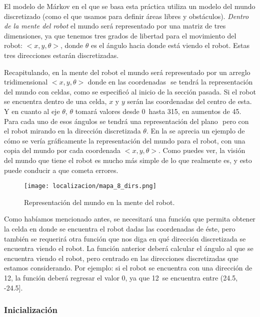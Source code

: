 El modelo de Márkov en el que se basa esta práctica utiliza un modelo del mundo discretizado (como el que usamos para definir áreas libres y obstáculos). \textit{Dentro de la mente del robot} el mundo será representado por una matriz de tres dimensiones, ya que tenemos tres grados de libertad para el movimiento del robot: \(<x,y,\theta>\), donde \( \theta \) es el ángulo hacia donde está viendo el robot. Estas tres direcciones estarán discretizadas.\par

Recapitulando, en la mente del robot el mundo será representado por un arreglo tridimensional \(<x,y,\theta>\) donde en las coordenadas \(<x,y>\) se tendrá la representación del mundo con celdas, como se especificó al inicio de la sección pasada. Si el robot se encuentra dentro de una celda, \(x\) y \(y\) serán las coordenadas del centro de esta. Y en cuanto al eje \(\theta\), \(\theta\) tomará valores desde 0\degree \ hasta 315\degree, en aumentos de 45\degree. Para cada uno de esos ángulos se tendrá una representación del plano \(<x,y>\) pero con el robot mirando en la dirección discretizada \(\theta\). En la  se aprecia un ejemplo de cómo se vería gráficamente la representación del mundo para el robot, con una copia del mundo por cada coordenada \(<x,y,\theta>\). Como puedes ver, la visión del mundo que tiene el robot es mucho más simple de lo que realmente es, y esto puede conducir a que cometa errores.

\begin{figure}
  \centering
  \texttt{[image: localizacion/mapa\_8\_dirs.png]}
  \caption{Representación del mundo en la mente del robot.}
  \label{fig:mapa2}
\end{figure}

Como habíamos mencionado antes, se necesitará una función que permita obtener la celda en donde se encuentra el robot dadas las coordenadas de éste, pero también se requerirá otra función que nos diga en qué dirección discretizada se encuentra viendo el robot. La función anterior deberá calcular el ángulo al que se encuentra viendo el robot, pero centrado en las direcciones discretizadas que estamos considerando. Por ejemplo: si el robot se encuentra con una dirección de 12\degree, la función deberá regresar el valor 0\degree, ya que 12\degree \ se encuentra entre (24.5\degree, -24.5\degree].\par

\subsubsection{Inicialización}

